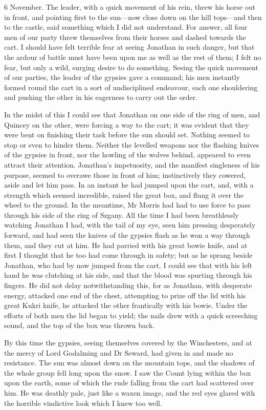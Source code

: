 \begin{diary}{6 November.}
The leader, with a quick movement of his rein, threw his horse out in front, and pointing first to the sun—now close down on the hill tops—and then to the castle, said something which I did not understand. For answer, all four men of our party threw themselves from their horses and dashed towards the cart. I should have felt terrible fear at seeing Jonathan in such danger, but that the ardour of battle must have been upon me as well as the rest of them; I felt no fear, but only a wild, surging desire to do something. Seeing the quick movement of our parties, the leader of the gypsies gave a command; his men instantly formed round the cart in a sort of undisciplined endeavour, each one shouldering and pushing the other in his eagerness to carry out the order.

In the midst of this I could see that Jonathan on one side of the ring of men, and Quincey on the other, were forcing a way to the cart; it was evident that they were bent on finishing their task before the sun should set. Nothing seemed to stop or even to hinder them. Neither the levelled weapons nor the flashing knives of the gypsies in front, nor the howling of the wolves behind, appeared to even attract their attention. Jonathan's impetuosity, and the manifest singleness of his purpose, seemed to overawe those in front of him; instinctively they cowered, aside and let him pass. In an instant he had jumped upon the cart, and, with a strength which seemed incredible, raised the great box, and flung it over the wheel to the ground. In the meantime, Mr Morris had had to use force to pass through his side of the ring of Szgany. All the time I had been breathlessly watching Jonathan I had, with the tail of my eye, seen him pressing desperately forward, and had seen the knives of the gypsies flash as he won a way through them, and they cut at him. He had parried with his great bowie knife, and at first I thought that he too had come through in safety; but as he sprang beside Jonathan, who had by now jumped from the cart, I could see that with his left hand he was clutching at his side, and that the blood was spurting through his fingers. He did not delay notwithstanding this, for as Jonathan, with desperate energy, attacked one end of the chest, attempting to prize off the lid with his great Kukri knife, he attacked the other frantically with his bowie. Under the efforts of both men the lid began to yield; the nails drew with a quick screeching sound, and the top of the box was thrown back.

By this time the gypsies, seeing themselves covered by the Winchesters, and at the mercy of Lord Godalming and Dr Seward, had given in and made no resistance. The sun was almost down on the mountain tops, and the shadows of the whole group fell long upon the snow. I saw the Count lying within the box upon the earth, some of which the rude falling from the cart had scattered over him. He was deathly pale, just like a waxen image, and the red eyes glared with the horrible vindictive look which I knew too well.


\end{diary}
